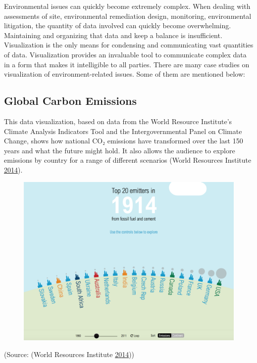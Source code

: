\documentclass[]{book}
\begin{document}
Environmental issues can quickly become extremely complex. When dealing
with assessments of site, environmental remediation design, monitoring,
environmental litigation, the quantity of data involved can quickly
become overwhelming. Maintaining and organizing that data and keep a
balance is insufficient. Visualization is the only means for condensing
and communicating vast quantities of data. Visualization provides an
invaluable tool to communicate complex data in a form that makes it
intelligible to all parties. There are many case studies on
visualization of environment-related issues. Some of them are mentioned
below:

\subsection{Global Carbon Emissions}\label{global-carbon-emissions}

This data visualization, based on data from the World Resource
Institute's Climate Analysis Indicators Tool and the Intergovernmental
Panel on Climate Change, shows how national CO₂ emissions have
transformed over the last 150 years and what the future might hold. It
also allows the audience to explore emissions by country for a range of
different scenarios (World Resources Institute
\protect\hyperlink{ref-CO2_emission}{2014}).

\begin{figure}
\centering
\includegraphics{images/carbon_emissions.png}
\caption{}
\end{figure}

(Source: (World Resources Institute
\protect\hyperlink{ref-CO2_emission}{2014}))
\end{document}
